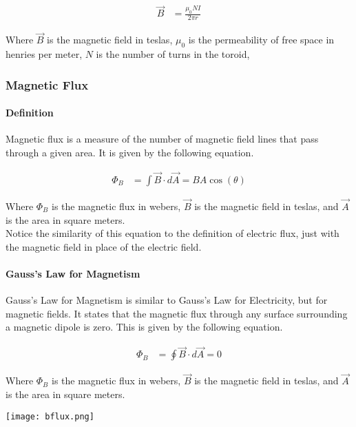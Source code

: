 \begin{align*}
    \vec{B} &= \frac{\mu_0 NI}{2\pi r}
\end{align*}

Where $\vec{B}$ is the magnetic field in teslas, $\mu_0$ is the permeability of free space in henries per meter, $N$ is the number of turns 
in the toroid,


\subsubsection*{Magnetic Flux}
\paragraph*{Definition}
Magnetic flux is a measure of the number of magnetic field lines that pass through a given area. It is given by the following equation.

\begin{align*}
    \Phi_B &= \int \vec{B} \cdot d\vec{A} = BA\cos(\theta)
\end{align*}

Where $\Phi_B$ is the magnetic flux in webers, $\vec{B}$ is the magnetic field in teslas, and $\vec{A}$ is the area in square meters.\\

Notice the similarity of this equation to the definition of electric flux, just with the magnetic field in place of the electric field.\\

\paragraph*{Gauss's Law for Magnetism}
Gauss's Law for Magnetism is similar to Gauss's Law for Electricity, but for magnetic fields. It states that the magnetic flux through any
surface surrounding a magnetic dipole is zero. This is given by the following equation.

\begin{align*}
    \Phi_B &= \oint \vec{B} \cdot d\vec{A} = 0
\end{align*}

Where $\Phi_B$ is the magnetic flux in webers, $\vec{B}$ is the magnetic field in teslas, and $\vec{A}$ is the area in square meters.\\

\begin{center}
    \texttt{[image: bflux.png]}
\end{center}
